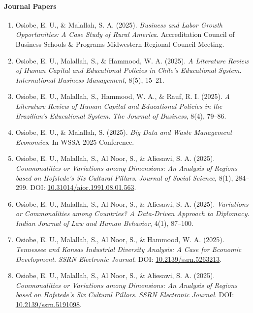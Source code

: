 \documentclass[11pt]{article}
\begin{document}
\paragraph{Journal Papers}
\begin{enumerate}

\item Osiobe, E. U., \& Malallah, S. A. (2025). \textit{Business and Labor Growth Opportunities: A Case Study of Rural America}. Accreditation Council of Business Schools \& Programs Midwestern Regional Council Meeting.

\item Osiobe, E. U., Malallah, S., \& Hammood, W. A. (2025). \textit{A Literature Review of Human Capital and Educational Policies in Chile’s Educational System}. \textit{International Business Management}, 8(5), 15–21.

\item Osiobe, E. U., Malallah, S., Hammood, W. A., \& Rauf, R. I. (2025). \textit{A Literature Review of Human Capital and Educational Policies in the Brazilian's Educational System}. \textit{The Journal of Business}, 8(4), 79–86.

\item Osiobe, E. U., \& Malallah, S. (2025). \textit{Big Data and Waste Management Economics}. In WSSA 2025 Conference.

\item Osiobe, E. U., Malallah, S., Al Noor, S., \& Aliesawi, S. A. (2025). \textit{Commonalities or Variations among Dimensions: An Analysis of Regions based on Hofstede's Six Cultural Pillars}. \textit{Journal of Social Science}, 8(1), 284–299. DOI: \href{https://doi.org/10.31014/aior.1991.08.01.563}{10.31014/aior.1991.08.01.563}.

\item Osiobe, E. U., Malallah, S., Al Noor, S., \& Aliesawi, S. A. (2025). \textit{Variations or Commonalities among Countries? A Data-Driven Approach to Diplomacy}. \textit{Indian Journal of Law and Human Behavior}, 4(1), 87–100.

\item Osiobe, E. U., Malallah, S., Al Noor, S., \& Hammood, W. A. (2025). \textit{Tennessee and Kansas Industrial Diversity Analysis: A Case for Economic Development}. \textit{SSRN Electronic Journal}. DOI: \href{https://doi.org/10.2139/ssrn.5263213}{10.2139/ssrn.5263213}.

\item Osiobe, E. U., Malallah, S., Al Noor, S., \& Aliesawi, S. A. (2025). \textit{Commonalities or Variations among Dimensions: An Analysis of Regions based on Hofstede's Six Cultural Pillars}. \textit{SSRN Electronic Journal}. DOI: \href{https://doi.org/10.2139/ssrn.5191098}{10.2139/ssrn.5191098}.


\end{enumerate}
\end{document}

